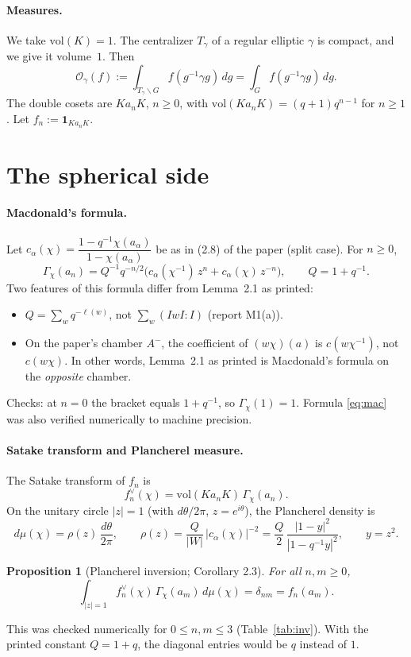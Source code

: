 \documentclass[11pt]{article}
\newtheorem{proposition}{Proposition}
\theoremstyle{remark}
\newcommand{\OO}{\mathcal{O}}
\begin{document}
\paragraph{Measures.}
We take $\mathrm{vol}(K)=1$. The centralizer $T_\gamma$ of a regular elliptic $\gamma$ is compact, and we give it volume~$1$. Then
\[
\OO_\gamma(f):=\int_{T_\gamma\backslash G}f(g^{-1}\gamma g)\,dg=\int_G f(g^{-1}\gamma g)\,dg.
\]
The double cosets are $Ka_nK$, $n\ge0$, with $\mathrm{vol}(Ka_nK)=(q+1)q^{n-1}$ for $n\ge1$. Let $f_n:=\mathbf 1_{Ka_nK}$.

\section{The spherical side}

\paragraph{Macdonald's formula.}
Let $c_\alpha(\chi)=\dfrac{1-q^{-1}\chi(a_\alpha)}{1-\chi(a_\alpha)}$ be as in (2.8) of the paper (split case). For $n\ge0$,
\begin{equation}\label{eq:mac}
\Gamma_\chi(a_n)=Q^{-1}q^{-n/2}\Big(c_\alpha(\chi^{-1})\,z^{n}+c_\alpha(\chi)\,z^{-n}\Big),\qquad Q=1+q^{-1}.
\end{equation}
Two features of this formula differ from Lemma~2.1 as printed:
\begin{itemize}
\item $Q=\sum_{w}q^{-\ell(w)}$, not $\sum_w(IwI:I)$ (report M1(a)).
\item On the paper's chamber $A^-$, the coefficient of $(w\chi)(a)$ is $c(w\chi^{-1})$, not $c(w\chi)$. In other words, Lemma~2.1 as printed is Macdonald's formula on the \emph{opposite} chamber.
\end{itemize}
Checks: at $n=0$ the bracket equals $1+q^{-1}$, so $\Gamma_\chi(1)=1$. Formula \eqref{eq:mac} was also verified numerically to machine precision.

\paragraph{Satake transform and Plancherel measure.}
The Satake transform of $f_n$ is
\[f_n^\vee(\chi)=\mathrm{vol}(Ka_nK)\,\Gamma_\chi(a_n).\] On the unitary circle $|z|=1$ (with $d\theta/2\pi$, $z=e^{i\theta}$), the Plancherel density is
\begin{equation}\label{eq:planch}
d\mu(\chi)=\rho(z)\,\frac{d\theta}{2\pi},\qquad
\rho(z)=\frac{Q}{|W|}\,|c_\alpha(\chi)|^{-2}=\frac{Q}{2}\,\frac{|1-y|^2}{|1-q^{-1}y|^2},\qquad y=z^2.
\end{equation}
\begin{proposition}[Plancherel inversion; Corollary 2.3]\label{prop:inv}
For all $n,m\ge0$,\[\int_{|z|=1}f_n^\vee(\chi)\,\Gamma_\chi(a_m)\,d\mu(\chi)=\delta_{nm}=f_n(a_m).\]
\end{proposition}
This was checked numerically for $0\le n,m\le3$ (Table~\ref{tab:inv}). With the printed constant $Q=1+q$, the diagonal entries would be $q$ instead of $1$.
\end{document}
